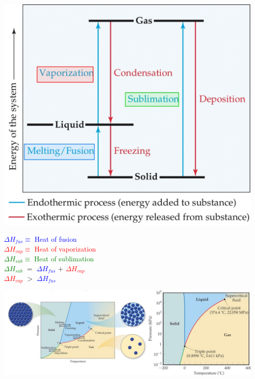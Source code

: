 \begin{minipage}{0.6\linewidth}
    \begin{center}
        \includegraphics[width = 0.8\linewidth]{images/Water_changes_agg_state.jpeg}
    \end{center}
\end{minipage}
\begin{minipage}{0.39\linewidth}
    \begin{center}
    {\small 
        \textcolor{blue}{$\Delta H_{fus} \equiv$ Heat of fusion}
        \vspace{3pt}\\
        \textcolor{red}{$\Delta H_{vap} \equiv$ Heat of vaporization}
        \vspace{3pt}\\
        \textcolor{green}{$\Delta H_{sub} \equiv$ Heat of sublimation}
        \vspace{3pt}\\
        \textcolor{green}{$\Delta H_{sub}$} $=$ \textcolor{blue}{$\Delta H_{fus}$} $+$  \textcolor{red}{$\Delta H_{vap}$}
        \vspace{3pt}\\
        \textcolor{red}{$\Delta H_{vap}$} $>$ \textcolor{blue}{$\Delta H_{fus}$}
        }
    \end{center}
\end{minipage}
\begin{center}
    \includegraphics[width = 0.9\linewidth]{images/PvsT_water.jpeg}
\end{center}